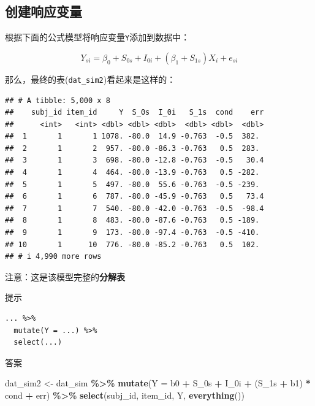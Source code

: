 \documentclass[
]{book}
\newenvironment{Shaded}{\begin{snugshade}}{\end{snugshade}}
\newcommand{\AttributeTok}[1]{\textcolor[rgb]{0.13,0.29,0.53}{#1}}
\newcommand{\FunctionTok}[1]{\textcolor[rgb]{0.13,0.29,0.53}{\textbf{#1}}}
\newcommand{\NormalTok}[1]{#1}
\newcommand{\OtherTok}[1]{\textcolor[rgb]{0.56,0.35,0.01}{#1}}
\newcommand{\SpecialCharTok}[1]{\textcolor[rgb]{0.81,0.36,0.00}{\textbf{#1}}}
\begin{document}
\hypertarget{ux521bux5efaux54cdux5e94ux53d8ux91cf}{%
\subsection{创建响应变量}\label{ux521bux5efaux54cdux5e94ux53d8ux91cf}}

根据下面的公式模型将响应变量\texttt{Y}添加到数据中：

\[Y_{si} = \beta_0 + S_{0s} + I_{0i} + (\beta_1 + S_{1s})X_{i} + e_{si}\]

那么，最终的表(\texttt{dat\_sim2})看起来是这样的：

\begin{verbatim}
## # A tibble: 5,000 x 8
##    subj_id item_id     Y  S_0s  I_0i   S_1s  cond    err
##      <int>   <int> <dbl> <dbl> <dbl>  <dbl> <dbl>  <dbl>
##  1       1       1 1078. -80.0  14.9 -0.763  -0.5  382. 
##  2       1       2  957. -80.0 -86.3 -0.763   0.5  283. 
##  3       1       3  698. -80.0 -12.8 -0.763  -0.5   30.4
##  4       1       4  464. -80.0 -13.9 -0.763   0.5 -282. 
##  5       1       5  497. -80.0  55.6 -0.763  -0.5 -239. 
##  6       1       6  787. -80.0 -45.9 -0.763   0.5   73.4
##  7       1       7  540. -80.0 -42.0 -0.763  -0.5  -98.4
##  8       1       8  483. -80.0 -87.6 -0.763   0.5 -189. 
##  9       1       9  173. -80.0 -97.4 -0.763  -0.5 -410. 
## 10       1      10  776. -80.0 -85.2 -0.763   0.5  102. 
## # i 4,990 more rows
\end{verbatim}

注意：这是该模型完整的\textbf{分解表}

提示

\begin{verbatim}
... %>% 
  mutate(Y = ...) %>%
  select(...)
\end{verbatim}

答案

\begin{Shaded}
\begin{Highlighting}[]
\NormalTok{dat\_sim2 }\OtherTok{\textless{}{-}}\NormalTok{ dat\_sim }\SpecialCharTok{\%\textgreater{}\%}
  \FunctionTok{mutate}\NormalTok{(}\AttributeTok{Y =}\NormalTok{ b0 }\SpecialCharTok{+}\NormalTok{ S\_0s }\SpecialCharTok{+}\NormalTok{ I\_0i }\SpecialCharTok{+}\NormalTok{ (S\_1s }\SpecialCharTok{+}\NormalTok{ b1) }\SpecialCharTok{*}\NormalTok{ cond }\SpecialCharTok{+}\NormalTok{ err) }\SpecialCharTok{\%\textgreater{}\%}
  \FunctionTok{select}\NormalTok{(subj\_id, item\_id, Y, }\FunctionTok{everything}\NormalTok{())}
\end{Highlighting}
\end{Shaded}
\end{document}
